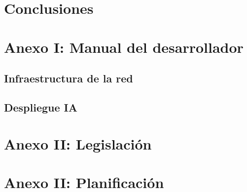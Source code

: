 \documentclass[10pt,a4paper,titlepage]{report}
\begin{document}
\chapter{Conclusiones}
	
	
\chapter{Anexo I: Manual del desarrollador}
	\section{Infraestructura de la red}
		
	
	\section{Despliegue IA}
		
		
\chapter{Anexo II: Legislación}
	
	
	
	
	
\chapter{Anexo II: Planificación}



\end{document}
